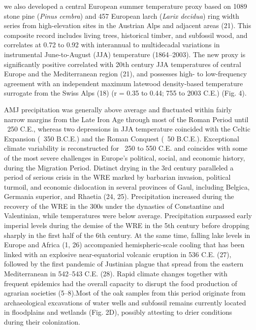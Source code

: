 \documentclass[10pt,a4paper,twoside,onecolumn]{article}
\begin{document}
\begin{myfont}
\begin{multicols}{3}
we also developed a central European summer temperature proxy based on 1089 stone pine (\textit{Pinus cembra}) and 457 European larch (\textit{Larix decidua}) ring width series from high-elevation sites in the Austrian Alps and adjacent areas (21). This composite record includes living trees, historical timber, and subfossil wood, and correlates at 0.72 to 0.92 with interannual to multidecadal variations in instrumental June-to-August (JJA) temperature (1864–2003). The new proxy is significantly positive correlated with 20th century JJA temperatures of central Europe and the Mediterranean region (21), and possesses high- to low-frequency agreement with an independent maximum latewood density-based temperature surrogate from the Swiss Alps (18) (r = 0.35 to 0.44; 755 to 2003 C.E.) (Fig. 4). \par
AMJ precipitation was generally above average and fluctuated within fairly narrow margins from the Late Iron Age through most of the Roman Period until ~250 C.E., whereas two depressions in JJA temperature coincided with the Celtic Expansion (~350 B.C.E.) and the Roman Conquest (~50 B.C.E.). Exceptional climate variability is reconstructed for ~250 to 550 C.E. and coincides with some of the most severe challenges in Europe’s political, social, and economic history, during the Migration Period. Distinct drying in the 3rd century paralleled a period of serious crisis in the WRE marked by barbarian invasion, political turmoil, and economic dislocation in several provinces of Gaul, including Belgica, Germania superior, and Rhaetia (24, 25). Precipitation increased during the recovery of the WRE in the 300s under the dynasties of Constantine and Valentinian, while temperatures were below average. Precipitation surpassed early
imperial levels during the demise of the WRE in the 5th century before dropping sharply in the first half of the 6th century. At the same time, falling
lake levels in Europe and Africa (1, 26) accompanied hemispheric-scale cooling that has been linked with an explosive near-equatorial volcanic eruption in 536 C.E. (27), followed by the first pandemic of Justinian plague that spread from the eastern Mediterranean in 542–543 C.E. (28). Rapid climate changes together with frequent epidemics had the overall capacity to disrupt the food production of agrarian societies (5–8).Most of the oak samples from this period originate from archaeological excavations of water wells and subfossil remains currently located in floodplains and wetlands (Fig. 2D), possibly attesting to drier
conditions during their colonization. \par

\end{multicols}
\end{myfont}
\end{document}
